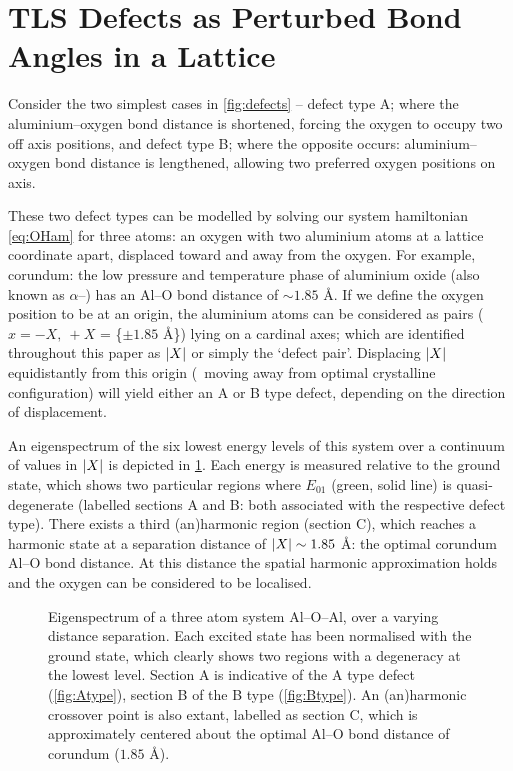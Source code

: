 \section[TLSs as Perturbed Bond Angles]{TLS Defects as Perturbed Bond Angles in a Lattice}\label{sec:bonds}

Consider the two simplest cases in \cref{fig:defects} -- defect type A; where the aluminium--oxygen bond distance is shortened, forcing the oxygen to occupy two off axis positions, and defect type B; where the opposite occurs: aluminium--oxygen bond distance is lengthened, allowing two preferred oxygen positions on axis.

These two defect types can be modelled by solving our system hamiltonian \cref{eq:OHam} for three atoms: an oxygen with two aluminium atoms at a lattice coordinate apart, displaced toward and away from the oxygen.
For example, corundum: the low pressure and temperature phase of aluminium oxide (also known as $\alpha$--) has an Al--O bond distance of $\sim\!1.85$ \AA.
If we define the oxygen position to be at an origin, the aluminium atoms can be considered as pairs ($x = -X, \: +X$ = \{$\pm 1.85$ \AA\}) lying on a cardinal axes; which are identified throughout this paper as $\lvert X\rvert$ or simply the `defect pair'.
Displacing $\lvert X\rvert$ equidistantly from this origin (\ie\ moving away from optimal crystalline configuration) will yield either an A or B type defect, depending on the direction of displacement.

An eigenspectrum of the six lowest energy levels of this system over a continuum of values in $\lvert X\rvert$  is depicted in \cref{fig:spectrum}.
Each energy is measured relative to the ground state, which shows two particular regions where $E_{01}$ (green, solid line) is quasi-degenerate (labelled sections A and B: both associated with the respective defect type).
There exists a third (an)harmonic region (section C), which reaches a harmonic state at a separation distance of $\lvert X\rvert \sim 1.85$ \AA: the optimal corundum Al--O bond distance.
At this distance the spatial harmonic approximation holds and the oxygen can be considered to be localised.

\begin{figure}[htp]
  \resizebox{0.9\textwidth}{!}{}
  \caption[Three Atom Eigenspectrum]{\label{fig:spectrum}Eigenspectrum of a three atom system Al--O--Al, over a varying distance separation. Each excited state has been normalised with the ground state, which clearly shows two regions with a degeneracy at the lowest level. Section A is indicative of the A type defect (\cref{fig:Atype}), section B of the B type (\cref{fig:Btype}). An (an)harmonic crossover point is also extant, labelled as section C, which is approximately centered about the optimal Al--O bond distance of corundum ($1.85$ \AA).}
\end{figure}


